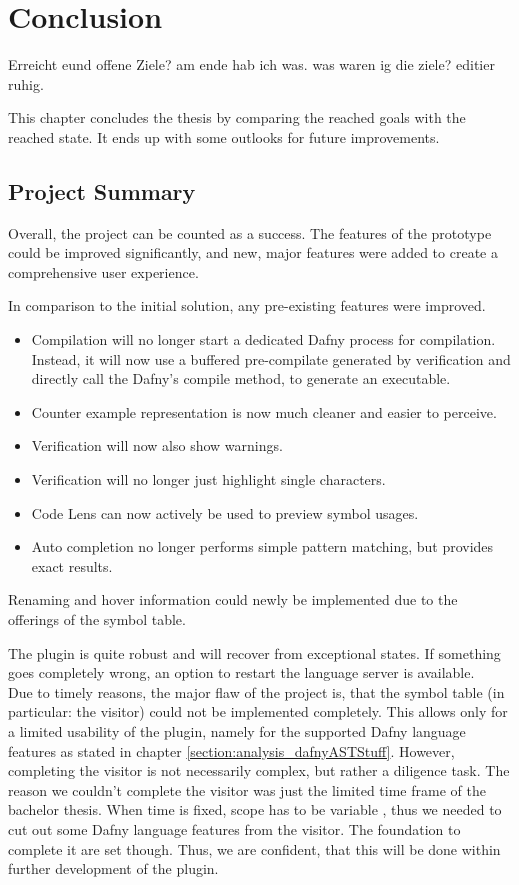 \section{Conclusion}
\label{section:conclusion}
Erreicht eund offene Ziele? am ende hab ich was. was waren ig die ziele? editier ruhig.


This chapter concludes the thesis by comparing the reached goals with the reached state.
It ends up with some outlooks for future improvements.

\subsection{Project Summary}
Overall, the project can be counted as a success.
The features of the prototype could be improved significantly, and new, major features were added to create a comprehensive user experience.

In comparison to the initial solution, any pre-existing features were improved.
\begin{itemize}
 \item Compilation will no longer start a dedicated Dafny process for compilation. Instead, it will now use a buffered pre-compilate generated by verification and directly call the Dafny's compile method, to generate an executable.
 \item Counter example representation is now much cleaner and easier to perceive.
 \item Verification will now also show warnings.
 \item Verification will no longer just highlight single characters.
 \item Code Lens can now actively be used to preview symbol usages.
 \item Auto completion no longer performs simple pattern matching, but provides exact results.
\end{itemize}
Renaming and hover information could newly be implemented due to the offerings of the symbol table.

The plugin is quite robust and will recover from exceptional states.
If something goes completely wrong, an option to restart the language server is available.\\

Due to timely reasons, the major flaw of the project is, that the symbol table (in particular: the visitor) could not be implemented completely.
This allows only for a limited usability of the plugin, namely for the supported Dafny language features as stated in chapter \ref{section:analysis_dafnyASTStuff}.
However, completing the visitor is not necessarily complex, but rather a diligence task.
The reason we couldn't complete the visitor was just the limited time frame of the bachelor thesis.
When time is fixed, scope has to be variable \cite{keller}, thus we needed to cut out some Dafny language features from the visitor.
The foundation to complete it are set though.
Thus, we are confident, that this will be done within further development of the plugin.\\

